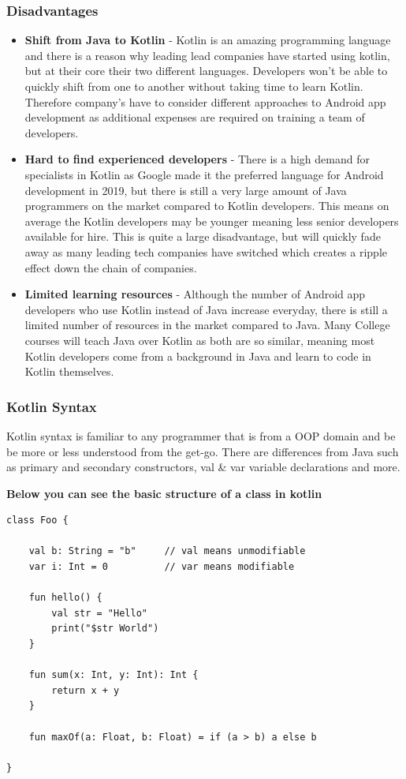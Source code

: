 \newpage

\subsubsection{Disadvantages}

\begin{itemize}
    \item \textbf{Shift from Java to Kotlin} - Kotlin is an amazing programming language and there is a reason why leading lead companies have started using kotlin, but at their core their two different languages. Developers won't be able to quickly shift from one to another without taking time to learn Kotlin. Therefore company's have to consider different approaches to Android app development as additional expenses are required on training a team of developers. 
    \item \textbf{Hard to find experienced developers} - There is a high demand for specialists in Kotlin as Google made it the preferred language for Android development in 2019, but there is still a very large amount of Java programmers on the market compared to Kotlin developers. This means on average the Kotlin developers may be younger meaning less senior developers available for hire. This is quite a large disadvantage, but will quickly fade away as many leading tech companies have switched which creates a ripple effect down the chain of companies.
    \item \textbf{Limited learning resources} - Although the number of Android app developers who use Kotlin instead of Java increase everyday, there is still a limited number of resources in the market compared to Java. Many College courses will teach Java over Kotlin as both are so similar, meaning most Kotlin developers come from a background in Java and learn to code in Kotlin themselves.
\end{itemize}

\newpage
\subsubsection{Kotlin Syntax}
Kotlin syntax is familiar to any programmer that is from a OOP domain and be be more or less understood from the get-go. There are differences from Java such as primary and secondary constructors, val \& var variable declarations and more.
\newline

\textbf{Below you can see the basic structure of a class in kotlin}
\begin{verbatim}
class Foo {

    val b: String = "b"     // val means unmodifiable
    var i: Int = 0          // var means modifiable

    fun hello() {
        val str = "Hello"
        print("$str World")
    }

    fun sum(x: Int, y: Int): Int {
        return x + y
    }

    fun maxOf(a: Float, b: Float) = if (a > b) a else b

}
\end{verbatim}

